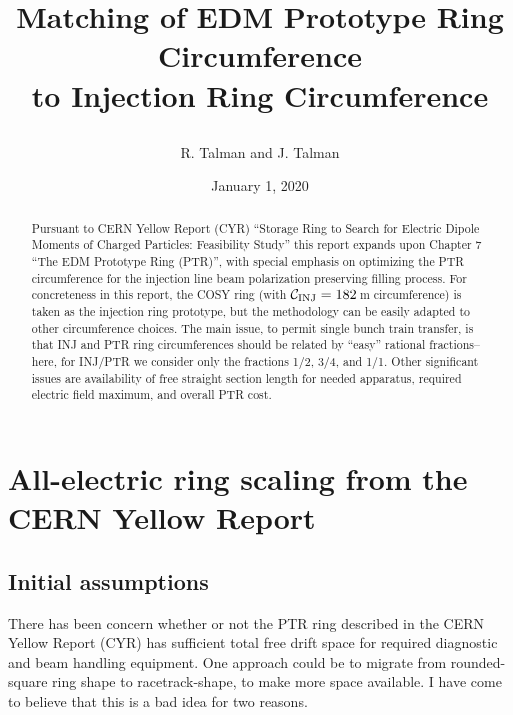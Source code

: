\documentclass[]{article}
\begin{document}
\date{January 1, 2020}

\title{
\centerline{}
\centerline{}
\centerline{}
Matching of EDM Prototype Ring Circumference \\
to Injection Ring Circumference
}
\author{R. Talman and J. Talman
}

\maketitle


\begin{abstract}
Pursuant to CERN Yellow Report (CYR) ``Storage Ring to Search
for Electric Dipole Moments of Charged Particles:
Feasibility Study'' this report expands upon Chapter 7 
``The EDM Prototype Ring (PTR)'', with special emphasis
on optimizing the PTR circumference for the injection line beam polarization
preserving filling process.  For concreteness in this report, the COSY ring
(with $\mathcal{C}_{\rm INJ}=182\,$m circumference) is taken as the injection 
ring prototype,
but the methodology can be easily adapted to other circumference choices.
The main issue, to permit single bunch train transfer, is that INJ and PTR
ring circumferences should be related by ``easy'' rational fractions--here,
for INJ/PTR we consider only the fractions 1/2, 3/4, and 1/1. Other
significant issues are availability of free straight section length for 
needed apparatus, required electric field maximum, and overall PTR cost. 
\end{abstract}
%

\section{All-electric ring scaling from the CERN Yellow Report}
\subsection{Initial assumptions}
There has been concern whether or not the PTR ring described in the 
CERN Yellow Report (CYR)\cite{CYR}  
has sufficient total free drift space for required diagnostic and beam handling equipment. 
One approach could be to migrate from rounded-square ring shape to racetrack-shape, to make 
more space available.  I have come to believe that this is a bad idea for two reasons. 
\end{document}
